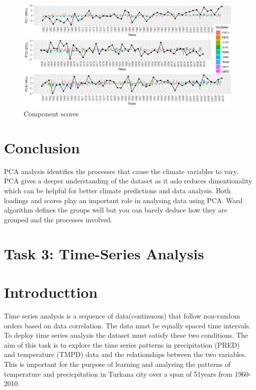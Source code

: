 \documentclass[12pt,a4paper]{article}
\begin{document}
\begin{enumerate}[label=\roman*)]
\newpage

\begin{figure}[h]
	\includegraphics[width=1.1\linewidth, height=0.5\textheight]{scores}
	\caption{Component scores}
	\label{fig:scores}
\end{figure}

\end{enumerate}

\newpage

\section{Conclusion}

PCA analysis identifies the processes that cause the climate variables to vary. PCA gives a deeper understanding of the dataset as it aslo reduces dimentionality which can be helpful for better climate predictions and data analysis. 
Both loadings and scores play an important role in analysing data using PCA. Ward algorithm defines the groups well but you can barely deduce how they are grouped and the processes involved.

\newpage
\section{Task 3: Time-Series Analysis }
\section{Introducttion}
Time series analysis is a sequence of data(continuous) that follow non-random orders based on data correlation. The data must be equally spaced time intervals. To deploy time series analysis the dataset must satisfy these two conditions. The aim of this task is to explore the time series patterns in precipitation (PRED) and temperature (TMPD) data and the relationships between the two variables. This is important for the purpose of learning and analysing the patterns of temperature and precicpitation in Turkana city over a span of 51years from 1960-2010.
\end{document}
